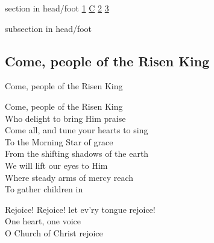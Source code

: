 \documentclass{beamer}
\begin{document}
{
{ 
 {
 \begin{beamercolorbox}[ht=4.5ex,dp=1.5ex,%
      leftskip=.3cm,rightskip=.3cm plus1fil]{section in head/foot}
 \fontsize{12}{25}\selectfont 
\hyperlink{Come, people of the Risen King[]1}{1}
\hyperlink{Come, people of the Risen King[]C}{C}
\hyperlink{Come, people of the Risen King[]2}{2}
\hyperlink{Come, people of the Risen King[]3}{3}
 
 \end{beamercolorbox}%
  \begin{beamercolorbox}[ht=2.5ex,dp=1.125ex,%
   leftskip=.3cm,rightskip=.3cm plus1fil]{subsection in head/foot}
   \insertauthor
 \end{beamercolorbox}%
 }
}
\subsection{ Come, people of the Risen King }

\hypertarget{Come, people of the Risen King[]1}{}
\begin{frame}{Come, people of the Risen King }
\fontsize{ 18 }{ 23 }\selectfont

Come, people of the Risen King\\ 
Who delight to bring Him praise\\ 
Come all, and tune your hearts to sing\\ 
To the Morning Star of grace\\ 
From the shifting shadows of the earth\\ 
We will lift our eyes to Him\\ 
Where steady arms of mercy reach\\ 
To gather children in 

\end{frame}

\hypertarget{Come, people of the Risen King[]C}{}
\begin{frame}{}
\fontsize{ 18 }{ 23 }\selectfont

Rejoice! Rejoice! let ev'ry tongue rejoice!\\ 
One heart, one voice\\ 
O Church of Christ rejoice 

\end{frame}

\hypertarget{Come, people of the Risen King[]2}{}
\begin{frame}{}
\fontsize{ 18 }{ 23 }\selectfont


\end{frame}}
\end{document}
